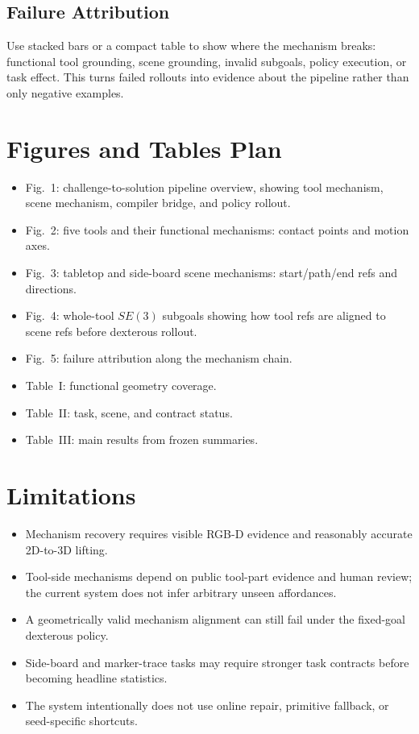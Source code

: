 \documentclass[journal]{IEEEtran}
\begin{document}
\subsection{Failure Attribution}
Use stacked bars or a compact table to show where the mechanism breaks:
functional tool grounding, scene grounding, invalid subgoals, policy execution,
or task effect. This turns failed rollouts into evidence about the pipeline
rather than only negative examples.

\section{Figures and Tables Plan}
\begin{itemize}
  \item Fig.~1: challenge-to-solution pipeline overview, showing tool
  mechanism, scene mechanism, compiler bridge, and policy rollout.
  \item Fig.~2: five tools and their functional mechanisms: contact points and
  motion axes.
  \item Fig.~3: tabletop and side-board scene mechanisms: start/path/end refs
  and directions.
  \item Fig.~4: whole-tool $SE(3)$ subgoals showing how tool refs are aligned
  to scene refs before dexterous rollout.
  \item Fig.~5: failure attribution along the mechanism chain.
  \item Table~I: functional geometry coverage.
  \item Table~II: task, scene, and contract status.
  \item Table~III: main results from frozen summaries.
\end{itemize}

\section{Limitations}
\begin{itemize}
  \item Mechanism recovery requires visible RGB-D evidence and reasonably
  accurate 2D-to-3D lifting.
  \item Tool-side mechanisms depend on public tool-part evidence and human
  review; the current system does not infer arbitrary unseen affordances.
  \item A geometrically valid mechanism alignment can still fail under the
  fixed-goal dexterous policy.
  \item Side-board and marker-trace tasks may require stronger task contracts
  before becoming headline statistics.
  \item The system intentionally does not use online repair, primitive
  fallback, or seed-specific shortcuts.
\end{itemize}
\end{document}
